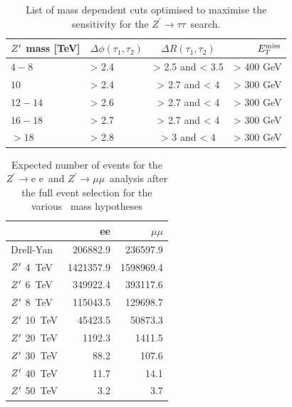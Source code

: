 \documentclass{cernrep}
\newcommand*{\Zptata}{\ensuremath{Z^{\prime}\rightarrow \tau\tau}}
\newcommand*{\Zpee}{\ensuremath{Z^{\prime}\rightarrow \text{e e}}}
\newcommand*{\Zpmumu}{\ensuremath{Z^{\prime}\rightarrow \mu\mu}}
\newcommand*{\met}{\ensuremath{E_{T}^{\rm{miss}}}}
\begin{document}
\begin{table}[htbp]
   \centering
\begin{tabular}{l|l|c|r}
   $Z^{\prime}$ mass [TeV] &  $\Delta \phi(\tau_1, \tau_2)$&  $\Delta R(\tau_1, \tau_2)$ & $\met$\\
  \hline
  $4-8$ & > 2.4 & > 2.5 and < 3.5 & > 400 GeV\\
  $10$ & > 2.4 & > 2.7 and < 4 & > 300 GeV\\
  $12-14$ & > 2.6 & > 2.7 and < 4 & > 300 GeV\\
  $16-18$ & > 2.7 & > 2.7 and < 4 & > 300 GeV\\
  $>18$ & > 2.8 & > 3 and < 4 & > 300 GeV\\
  \end{tabular}
  \caption{List of mass dependent cuts optimised to maximise the sensitivity for the \Zptata\ search.}
  \label{tab:leptonicresonances:selectiontautau}
\end{table}

\begin{table}[htbp]
   \centering
\begin{tabular}{l|r|r}
 & ee & $\mu\mu$  \\
  \hline
  Drell-Yan & 206882.9 & 236597.9 \\
  \hline
  $Z^{\prime}$ 4~TeV & 1421357.9    & 1598969.4 \\
  $Z^{\prime}$ 6~TeV & 349922.4  & 393117.6\\
  $Z^{\prime}$ 8~TeV &   115043.5 & 129698.7 \\
  $Z^{\prime}$ 10~TeV &  45423.5 & 50873.3 \\
  $Z^{\prime}$ 20~TeV &  1192.3 & 1411.5\\
  $Z^{\prime}$ 30~TeV &  88.2 & 107.6\\
  $Z^{\prime}$ 40~TeV &  11.7 & 14.1 \\
  $Z^{\prime}$ 50~TeV &  3.2 & 3.7\\
\end{tabular}
  \caption{Expected number of events for the \Zpee\ and \Zpmumu\ analysis after the full event selection for the various \Zp\ mass hypotheses}
  \label{tab:leptonicresonances:yieldsll}
\end{table}
\end{document}
